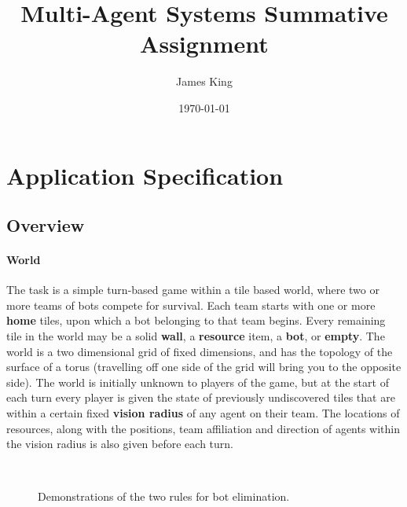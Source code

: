 \documentclass[a4paper,10pt]{article}
\title{Multi-Agent Systems Summative Assignment}
\date{\today}
\author{James King}
\begin{document}
\maketitle

\section{Application Specification}
\subsection{Overview}
\paragraph{World}
The task is a simple turn-based game within a tile based world, where two or more teams of bots compete for survival. Each team starts with one or more \textbf{home} tiles, upon which a bot belonging to that team begins. Every remaining tile in the world may be a solid \textbf{wall}, a \textbf{resource} item, a \textbf{bot}, or \textbf{empty}. The world is a two dimensional grid of fixed dimensions, and has the topology of the surface of a torus (travelling off one side of the grid will bring you to the opposite side). The world is initially unknown to players of the game, but at the start of each turn every player is given the state of previously undiscovered tiles that are within a certain fixed \textbf{vision radius} of any agent on their team. The locations of resources, along with the positions, team affiliation and direction of agents within the vision radius is also given before each turn.

\begin{figure}[ht]
  \centering
  \mbox{
    \quad
  }
  \caption{Demonstrations of the two rules for bot elimination.}
  \vspace{-5mm}
\end{figure}
\end{document}
